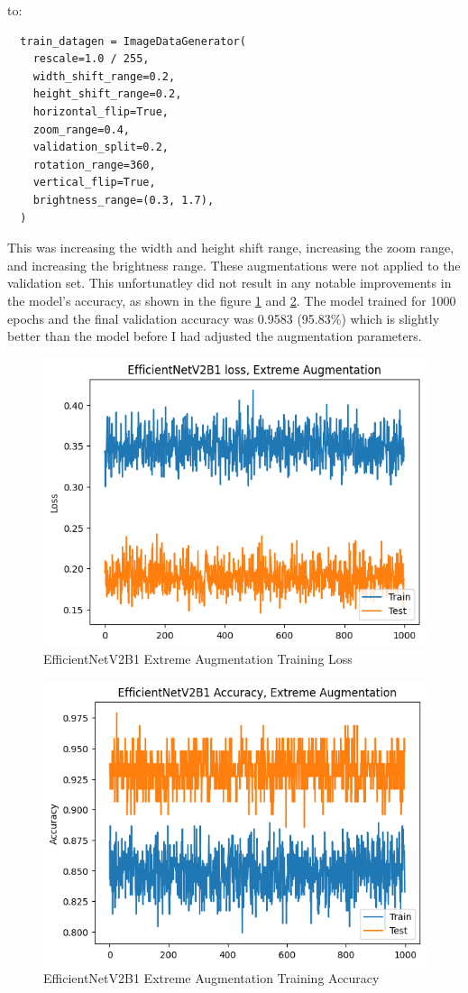 \documentclass[]{final_report}
\begin{document}
to:

\begin{lstlisting}
  train_datagen = ImageDataGenerator(
    rescale=1.0 / 255,
    width_shift_range=0.2,
    height_shift_range=0.2,
    horizontal_flip=True,
    zoom_range=0.4,
    validation_split=0.2,
    rotation_range=360,
    vertical_flip=True,
    brightness_range=(0.3, 1.7),
  )
\end{lstlisting}

This was increasing the width and height shift range, increasing the zoom range, and increasing the brightness range. These augmentations were not applied to the validation set. This unfortunatley did not result in any notable improvements in the model's accuracy, as shown in the figure \ref{fig:EfficientNetV2B1-extreme-augmentation-training-loss} and \ref{fig:EfficientNetV2B1-extreme-augmentation-training-accuracy}. The model trained for 1000 epochs and the final validation accuracy was 0.9583 (95.83\%) which is slightly better than the model before I had adjusted the augmentation parameters.

\begin{figure}[ht!]
  \centering
  \includegraphics[width=0.7\linewidth]{images/EfficientNetV2B1-Extreme-Augmentation-Loss.png}
  \caption{EfficientNetV2B1 Extreme Augmentation Training Loss}
  \label{fig:EfficientNetV2B1-extreme-augmentation-training-loss}
\end{figure}

\begin{figure}[ht!]
  \centering
  \includegraphics[width=0.7\linewidth]{images/EfficientNetV2B1-Extreme-Augmentation-Accuracy.png}
  \caption{EfficientNetV2B1 Extreme Augmentation Training Accuracy}
  \label{fig:EfficientNetV2B1-extreme-augmentation-training-accuracy}
\end{figure}
\end{document}
